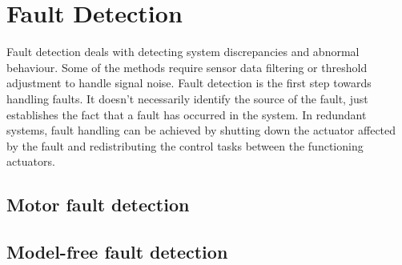 \newpage
\section{Fault Detection}

Fault detection deals with detecting system discrepancies and abnormal behaviour. Some of the methods require sensor data filtering or threshold adjustment to handle signal noise. Fault detection is the first step towards handling faults. It doesn't necessarily identify the source of the fault, just establishes the fact that a fault has occurred in the system. In redundant systems, fault handling can be achieved by shutting down the actuator affected by the fault and redistributing the control tasks between the functioning actuators.




\subsection{Motor fault detection}


\subsection{Model-free fault detection}















